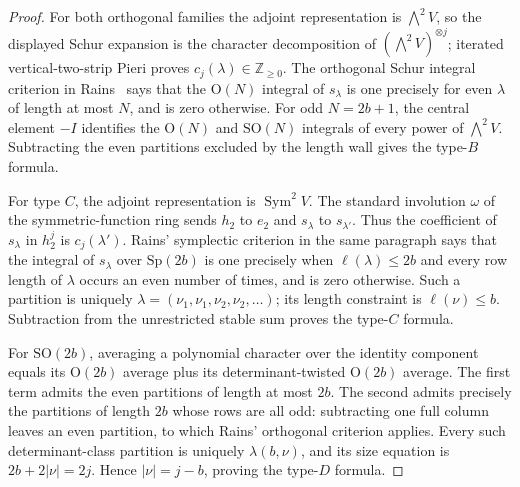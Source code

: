 \documentclass[11pt,reqno]{amsart}
\theoremstyle{plain}
\theoremstyle{definition}
\begin{document}
\begin{proof}
For both orthogonal families the adjoint representation is
$\bigwedge^2V$, so the displayed Schur expansion is the character
decomposition of $(\bigwedge^2V)^{\otimes j}$; iterated vertical-two-strip
Pieri proves $c_j(\lambda)\in\mathbb Z_{\geq0}$.  The orthogonal Schur
integral criterion in Rains~\cite[Section~3, paragraph preceding
Lemma~3.1]{Rains1997} says that the $\mathrm O(N)$ integral of $s_\lambda$
is one precisely for even $\lambda$ of length at most $N$, and is zero
otherwise.  For odd $N=2b+1$, the central element $-I$ identifies the
$\mathrm O(N)$ and $\mathrm{SO}(N)$ integrals of every power of
$\bigwedge^2V$.  Subtracting the even partitions excluded by the length
wall gives the type-$B$ formula.

For type $C$, the adjoint representation is $\operatorname{Sym}^2V$.
The standard involution $\omega$ of the symmetric-function ring sends
$h_2$ to $e_2$ and $s_\lambda$ to $s_{\lambda'}$.  Thus the coefficient of
$s_\lambda$ in $h_2^j$ is $c_j(\lambda')$.  Rains' symplectic criterion in
the same paragraph says that the integral of $s_\lambda$ over
$\mathrm{Sp}(2b)$ is one precisely when $\ell(\lambda)\leq2b$ and every
row length of $\lambda$ occurs an even number of times, and is zero
otherwise.  Such a partition is uniquely
$\lambda=(\nu_1,\nu_1,\nu_2,\nu_2,\ldots)$; its length constraint is
$\ell(\nu)\leq b$.  Subtraction from the unrestricted stable sum proves the
type-$C$ formula.

For $\mathrm{SO}(2b)$, averaging a polynomial character over the identity
component equals its $\mathrm O(2b)$ average plus its determinant-twisted
$\mathrm O(2b)$ average.  The first term admits the even partitions of
length at most $2b$.  The second admits precisely the partitions of length
$2b$ whose rows are all odd: subtracting one full column leaves an even
partition, to which Rains' orthogonal criterion applies.  Every such
determinant-class partition is uniquely $\lambda(b,\nu)$, and its size
equation is
$2b+2|\nu|=2j$.  Hence $|\nu|=j-b$, proving the type-$D$ formula.
\end{proof}
\end{document}

